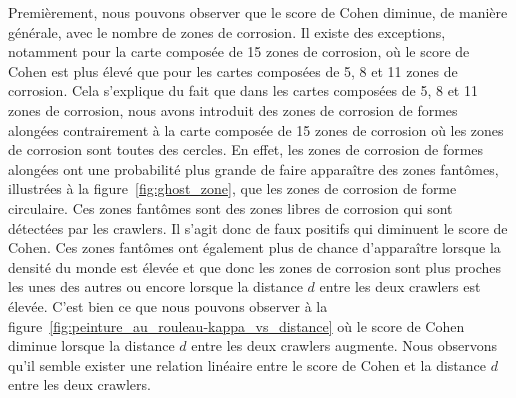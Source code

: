 \documentclass[francais,RandD]{rapportPFE}
\begin{document}
			Premièrement, nous pouvons observer que le score de Cohen diminue, de manière générale, avec le nombre de zones de corrosion.
			Il existe des exceptions, notamment pour la carte composée de 15 zones de corrosion, où le score de Cohen est plus élevé que pour les cartes composées de 5, 8 et 11 zones de corrosion.
			Cela s'explique du fait que dans les cartes composées de 5, 8 et 11 zones de corrosion, nous avons introduit des zones de corrosion de formes alongées contrairement à la carte composée de 15 zones de corrosion où les zones de corrosion sont toutes des cercles.
			En effet, les zones de corrosion de formes alongées ont une probabilité plus grande de faire apparaître des zones fantômes, illustrées à la figure~\ref{fig:ghost_zone}, que les zones de corrosion de forme circulaire.
			Ces zones fantômes sont des zones libres de corrosion qui sont détectées par les crawlers.
			Il s'agit donc de faux positifs qui diminuent le score de Cohen.
			Ces zones fantômes ont également plus de chance d'apparaître lorsque la densité du monde est élevée et que donc les zones de corrosion sont plus proches les unes des autres ou encore lorsque la distance $d$ entre les deux crawlers est élevée.
			C'est bien ce que nous pouvons observer à la figure~\ref{fig:peinture_au_rouleau-kappa_vs_distance} où le score de Cohen diminue lorsque la distance $d$ entre les deux crawlers augmente.
			Nous observons qu'il semble exister une relation linéaire entre le score de Cohen et la distance $d$ entre les deux crawlers.
\end{document}
